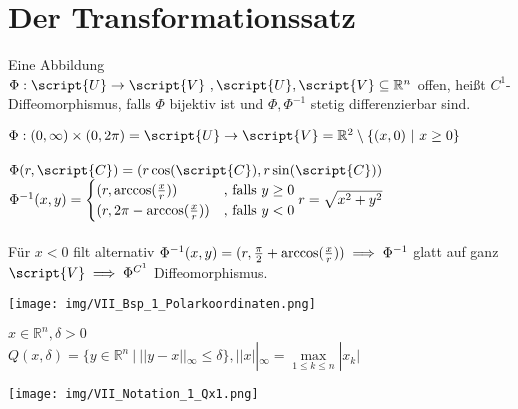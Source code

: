 \chapter{Der Transformationssatz}
  \begin{definition}
    Eine Abbildung $\Phi: \script{U} \to \script{V} \ ,\script{U}, \script{V} \subseteq \mathbb{R}^n$ offen, heißt $C^1$-Diffeomorphismus, falls $\Phi$ bijektiv ist und $\Phi, \Phi^{-1}$ stetig differenzierbar sind.
  \end{definition}

  \begin{example}
    $\Phi: (0, \infty) \times (0, 2\pi) = \script{U} \to \script{V} = \mathbb{R}^2 \setminus \{(x,0) \ | \ x \geq 0\}$\\
    \\
    $\Phi(r, \script{C}) = (r \cos(\script{C}), r \sin(\script{C}))$\\
    $\Phi^{-1}(x,y) = \begin{cases}
      (r, \arccos(\frac{x}{r})) & \text{, falls } y \geq 0\\
      (r, 2\pi - \arccos(\frac{x}{r})) & \text{, falls } y < 0
    \end{cases}\\
    r = \sqrt{x^2 + y^2}$\\
    \\
    Für $x < 0$ filt alternativ $\Phi^{-1}(x,y) = (r, \frac{\pi}{2} + \arccos(\frac{x}{r}))\\
    \implies \Phi^{-1}$ glatt auf ganz $\script{V} \implies \Phi^{C^1}$ Diffeomorphismus.
    \begin{center}
      \texttt{[image: img/VII\_Bsp\_1\_Polarkoordinaten.png]}
    \end{center}
  \end{example}

  \begin{remark}[Notation]
    $x \in \mathbb{R}^n, \delta >0$\\
    $Q(x, \delta) = \{y \in \mathbb{R}^n \ | \ ||y-x||_{\infty} \leq \delta\}, ||x||_{\infty} = \max\limits_{1 \leq k \leq n} | x_k |$
    \begin{center}
      \texttt{[image: img/VII\_Notation\_1\_Qx1.png]}
    \end{center}
  \end{remark}

